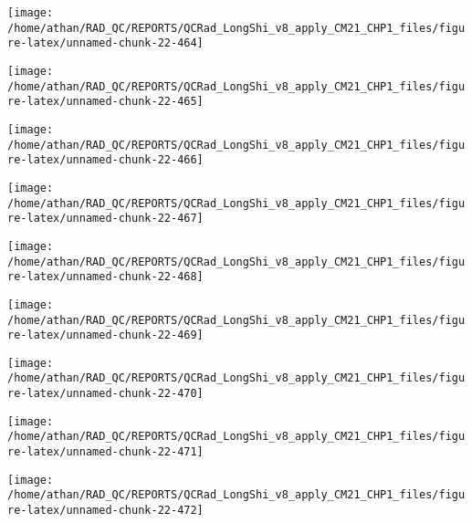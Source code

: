 \documentclass[
  10pt,
  a4paper,oneside]{article}
\begin{document}
\begin{center}\texttt{[image: /home/athan/RAD\_QC/REPORTS/QCRad\_LongShi\_v8\_apply\_CM21\_CHP1\_files/figure-latex/unnamed-chunk-22-464]} \end{center}

\begin{center}\texttt{[image: /home/athan/RAD\_QC/REPORTS/QCRad\_LongShi\_v8\_apply\_CM21\_CHP1\_files/figure-latex/unnamed-chunk-22-465]} \end{center}

\begin{center}\texttt{[image: /home/athan/RAD\_QC/REPORTS/QCRad\_LongShi\_v8\_apply\_CM21\_CHP1\_files/figure-latex/unnamed-chunk-22-466]} \end{center}

\begin{center}\texttt{[image: /home/athan/RAD\_QC/REPORTS/QCRad\_LongShi\_v8\_apply\_CM21\_CHP1\_files/figure-latex/unnamed-chunk-22-467]} \end{center}

\begin{center}\texttt{[image: /home/athan/RAD\_QC/REPORTS/QCRad\_LongShi\_v8\_apply\_CM21\_CHP1\_files/figure-latex/unnamed-chunk-22-468]} \end{center}

\begin{center}\texttt{[image: /home/athan/RAD\_QC/REPORTS/QCRad\_LongShi\_v8\_apply\_CM21\_CHP1\_files/figure-latex/unnamed-chunk-22-469]} \end{center}

\begin{center}\texttt{[image: /home/athan/RAD\_QC/REPORTS/QCRad\_LongShi\_v8\_apply\_CM21\_CHP1\_files/figure-latex/unnamed-chunk-22-470]} \end{center}

\begin{center}\texttt{[image: /home/athan/RAD\_QC/REPORTS/QCRad\_LongShi\_v8\_apply\_CM21\_CHP1\_files/figure-latex/unnamed-chunk-22-471]} \end{center}

\begin{center}\texttt{[image: /home/athan/RAD\_QC/REPORTS/QCRad\_LongShi\_v8\_apply\_CM21\_CHP1\_files/figure-latex/unnamed-chunk-22-472]} \end{center}
\end{document}
